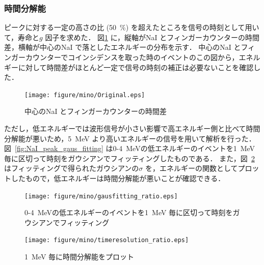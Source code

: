 
\subsubsection{時間分解能}
ピークに対する一定の高さの比 (50~\%) を超えたところを信号の時刻として用いて，寿命と$g$ 因子を求めた．
図\ref{fig:Original} に，縦軸がNaI とフィンガーカウンターの時間差，横軸が中心のNaI で落としたエネルギーの分布を示す．
中心のNaI とフィンガーカウンターでコインシデンスを取った時のイベントのこの図から，エネルギーに対して時間差がほとんど一定で信号の時刻の補正は必要ないことを確認した．

\begin{figure}[H]%
\centering
\texttt{[image: figure/mino/Original.eps]}
\caption{中心のNaI とフィンガーカウンターの時間差}
\label{fig:Original}
\end{figure}

ただし，低エネルギーでは波形信号が小さい影響で高エネルギー側と比べて時間分解能が悪いため，5~MeV より高いエネルギーの信号を用いて解析を行った．図~\ref{fig:NaI_peak_gaus_fitting} は0-4~MeVの低エネルギーのイベントを1~MeV 毎に区切って時刻をガウシアンでフィッティングしたものである．
また，図~\ref{fig:NaI_peak_time_resolution} はフィッティングで得られたガウシアンの$\sigma$ を，エネルギーの関数としてプロットしたもので，低エネルギーは時間分解能が悪いことが確認できる．

\begin{figure}[H]%
\begin{minipage}{0.5\hsize}
\centering
\texttt{[image: figure/mino/gausfitting\_ratio.eps]}
\caption{0-4~MeVの低エネルギーのイベントを1~MeV 毎に区切って時刻をガウシアンでフィッティング}
\label{fig:NaI_peak_gaus_fitting}
\end{minipage}
\begin{minipage}{0.5\hsize}
\centering
\texttt{[image: figure/mino/timeresolution\_ratio.eps]}
\caption{1~MeV 毎に時間分解能をプロット}
\label{fig:NaI_peak_time_resolution}
\end{minipage}
\end{figure}


